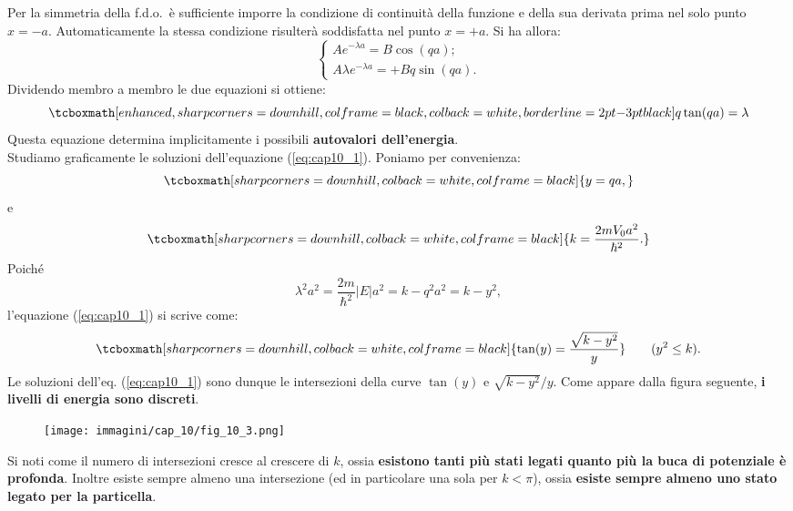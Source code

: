 Per la simmetria della f.d.o.~è sufficiente imporre la condizione di continuità della funzione e della sua derivata prima nel solo punto $x=-a$. Automaticamente la stessa condizione risulterà soddisfatta nel punto $x=+a$. Si ha allora:
	\begin{equation}
		\begin{cases}
		Ae^{-\lambda a} =B\cos(qa) ;\\
		A \lambda e^{-\lambda a} = +Bq \sin(qa).\end{cases} 
	\end{equation}
Dividendo membro a membro le due equazioni si ottiene:
	\begin{equation}
		\tcboxmath[enhanced, sharp corners=downhill, colframe=black, colback=white, borderline={2pt}{-3pt}{black}]{
			q \tan (qa) =\lambda
			}
	\label{eq:cap10_1}
	\end{equation}
Questa equazione determina implicitamente i possibili \textbf{autovalori dell'energia}.\\

Studiamo graficamente le soluzioni dell'equazione (\ref{eq:cap10_1}). Poniamo per convenienza:
	\begin{equation}
		\tcboxmath[sharp corners=downhill, colback=white, colframe=black]{
			y=qa,
			}
	\end{equation}
e
	\begin{equation}
		\tcboxmath[sharp corners=downhill, colback=white, colframe=black]{
		k=\frac{2mV_0 a^2}{\hbar ^2}.
		}
	\end{equation}
Poiché
	\begin{equation}
		\lambda ^2 a^2 = \frac{2m }{\hbar ^2}|E|a^2=k-q^2 a^2 =k-y^2,
	\end{equation}
l'equazione (\ref{eq:cap10_1}) si scrive come:
	\begin{equation}
		\tcboxmath[sharp corners=downhill, colback=white, colframe=black]{
			\tan (y) = \frac{\sqrt{k-y^2}}{y}
			} \qquad (y^2 \leq k).
	\end{equation}
Le soluzioni dell'eq. (\ref{eq:cap10_1}) sono dunque le intersezioni della curve $\tan (y)$ e $\sqrt{k-y^2}/y$. Come appare dalla figura seguente, \textbf{i livelli di energia sono discreti}.
\begin{figure}[!htbp]
\texttt{[image: immagini/cap\_10/fig\_10\_3.png]}
\end{figure}
\newpage

Si noti come il numero di intersezioni cresce al crescere di $k$, ossia \textbf{esistono tanti più stati legati quanto più la buca di potenziale è profonda}. Inoltre esiste sempre almeno una intersezione (ed in particolare una sola per $k<\pi$), ossia \textbf{esiste sempre almeno uno stato legato per la particella}.\\

